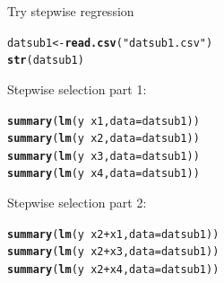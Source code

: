 \documentclass[10pt]{beamer}\usepackage[]{graphicx}\usepackage[]{color}
\makeatletter
\newcommand{\hlstr}[1]{\textcolor[rgb]{0.192,0.494,0.8}{#1}}%
\newcommand{\hlopt}[1]{\textcolor[rgb]{0,0,0}{#1}}%
\newcommand{\hlstd}[1]{\textcolor[rgb]{0.345,0.345,0.345}{#1}}%
\newcommand{\hlkwb}[1]{\textcolor[rgb]{0.69,0.353,0.396}{#1}}%
\newcommand{\hlkwc}[1]{\textcolor[rgb]{0.333,0.667,0.333}{#1}}%
\newcommand{\hlkwd}[1]{\textcolor[rgb]{0.737,0.353,0.396}{\textbf{#1}}}%
\newenvironment{kframe}{%
 \def\at@end@of@kframe{}%
 \ifinner\ifhmode%
  \def\at@end@of@kframe{\end{minipage}}%
  \begin{minipage}{\columnwidth}%
 \fi\fi%
 \def\FrameCommand##1{\hskip\@totalleftmargin \hskip-\fboxsep
 \colorbox{shadecolor}{##1}\hskip-\fboxsep
     \hskip-\linewidth \hskip-\@totalleftmargin \hskip\columnwidth}%
 \MakeFramed {\advance\hsize-\width
   \@totalleftmargin\z@ \linewidth\hsize
   \@setminipage}}%
 {\par\unskip\endMakeFramed%
 \at@end@of@kframe}
\newenvironment{knitrout}{}{} %
\makeatother
\begin{document}
\begin{frame}[fragile]{Try stepwise regression}


\begin{knitrout}\small
{}\color{fgcolor}\begin{kframe}
\begin{alltt}
\hlstd{datsub1} \hlkwb{<-} \hlkwd{read.csv}\hlstd{(}\hlstr{"datsub1.csv"}\hlstd{)}
\hlkwd{str}\hlstd{(datsub1)}
\end{alltt}
\end{kframe}
\end{knitrout}

\pause 

Stepwise selection part 1:\vspace{-0.1cm}
\begin{knitrout}\small
{}\color{fgcolor}\begin{kframe}
\begin{alltt}
\hlkwd{summary}\hlstd{(}\hlkwd{lm}\hlstd{(y} \hlopt{~} \hlstd{x1,} \hlkwc{data} \hlstd{= datsub1))}
\hlkwd{summary}\hlstd{(}\hlkwd{lm}\hlstd{(y} \hlopt{~} \hlstd{x2,} \hlkwc{data} \hlstd{= datsub1))}
\hlkwd{summary}\hlstd{(}\hlkwd{lm}\hlstd{(y} \hlopt{~} \hlstd{x3,} \hlkwc{data} \hlstd{= datsub1))}
\hlkwd{summary}\hlstd{(}\hlkwd{lm}\hlstd{(y} \hlopt{~} \hlstd{x4,} \hlkwc{data} \hlstd{= datsub1))}
\end{alltt}
\end{kframe}
\end{knitrout}

\pause

Stepwise selection part 2:\vspace{-0.1cm}
\begin{knitrout}\small
{}\color{fgcolor}\begin{kframe}
\begin{alltt}
\hlkwd{summary}\hlstd{(}\hlkwd{lm}\hlstd{(y} \hlopt{~} \hlstd{x2} \hlopt{+} \hlstd{x1,} \hlkwc{data} \hlstd{= datsub1))}
\hlkwd{summary}\hlstd{(}\hlkwd{lm}\hlstd{(y} \hlopt{~} \hlstd{x2} \hlopt{+} \hlstd{x3,} \hlkwc{data} \hlstd{= datsub1))}
\hlkwd{summary}\hlstd{(}\hlkwd{lm}\hlstd{(y} \hlopt{~} \hlstd{x2} \hlopt{+} \hlstd{x4,} \hlkwc{data} \hlstd{= datsub1))}
\end{alltt}
\end{kframe}
\end{knitrout}


\end{frame}
\end{document}
